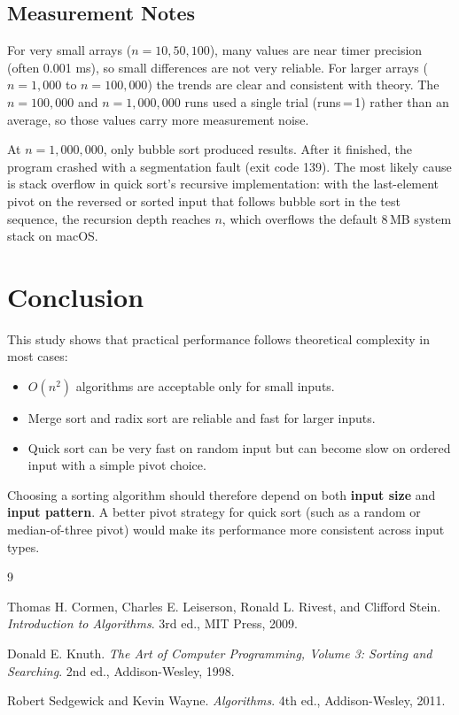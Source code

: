 \documentclass[11pt,a4paper]{article}
\begin{document}
\subsection{Measurement Notes}\label{sec:notes}
For very small arrays (\(n=10,50,100\)), many values are near timer precision (often 0.001 ms), so small differences are not very reliable. For larger arrays (\(n=1{,}000\) to \(n=100{,}000\)) the trends are clear and consistent with theory. The \(n=100{,}000\) and \(n=1{,}000{,}000\) runs used a single trial (runs\,=\,1) rather than an average, so those values carry more measurement noise.

At \(n=1{,}000{,}000\), only bubble sort produced results. After it finished, the program crashed with a segmentation fault (exit code 139). The most likely cause is stack overflow in quick sort's recursive implementation: with the last-element pivot on the reversed or sorted input that follows bubble sort in the test sequence, the recursion depth reaches \(n\), which overflows the default 8\,MB system stack on macOS.

\section{Conclusion}
This study shows that practical performance follows theoretical complexity in most cases:
\begin{itemize}
    \item \(O(n^2)\) algorithms are acceptable only for small inputs.
    \item Merge sort and radix sort are reliable and fast for larger inputs.
    \item Quick sort can be very fast on random input but can become slow on ordered input with a simple pivot choice.
\end{itemize}

Choosing a sorting algorithm should therefore depend on both \textbf{input size} and \textbf{input pattern}. A better pivot strategy for quick sort (such as a random or median-of-three pivot) would make its performance more consistent across input types.

\begin{thebibliography}{9}

Thomas H. Cormen, Charles E. Leiserson, Ronald L. Rivest, and Clifford Stein.
\textit{Introduction to Algorithms}.
3rd ed., MIT Press, 2009.

Donald E. Knuth.
\textit{The Art of Computer Programming, Volume 3: Sorting and Searching}.
2nd ed., Addison-Wesley, 1998.

Robert Sedgewick and Kevin Wayne.
\textit{Algorithms}.
4th ed., Addison-Wesley, 2011.

\end{thebibliography}
\end{document}
